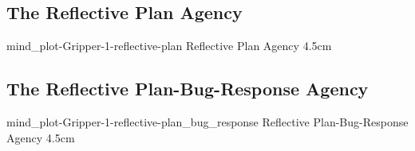 {\clearpage
  \subsection{The Reflective Plan Agency}
  \experimentcausegroupplots{\dataappendixmaxtime}
                            {\dataappendixexperimentonemaxtime}
                            {\dataappendixexperimenttwomaxtime}
                            {\dataappendixexperimentthreemaxtime}
                            {\dataappendixexperimentonename}
                            {\dataappendixexperimenttwoname}
                            {\dataappendixexperimentthreename}
                            {\dataappendixexperimentoneprettyname}
                            {\dataappendixexperimenttwoprettyname}
                            \experimentcausegroupplotscontinued{\dataappendixexperimentthreeprettyname}
                                                               {mind_plot-Gripper-1-reflective-plan}
                                                               {Reflective Plan Agency}
                                                               {\experimentdatacommontablereference}
                                                               {4.5cm}
}
{\clearpage
  \subsection{The Reflective Plan-Bug-Response Agency}
  \experimentcausegroupplots{\dataappendixmaxtime}
                            {\dataappendixexperimentonemaxtime}
                            {\dataappendixexperimenttwomaxtime}
                            {\dataappendixexperimentthreemaxtime}
                            {\dataappendixexperimentonename}
                            {\dataappendixexperimenttwoname}
                            {\dataappendixexperimentthreename}
                            {\dataappendixexperimentoneprettyname}
                            {\dataappendixexperimenttwoprettyname}
                            \experimentcausegroupplotscontinued{\dataappendixexperimentthreeprettyname}
                                                               {mind_plot-Gripper-1-reflective-plan_bug_response}
                                                               {Reflective Plan-Bug-Response Agency}
                                                               {\experimentdatacommontablereference}
                                                               {4.5cm}
}
